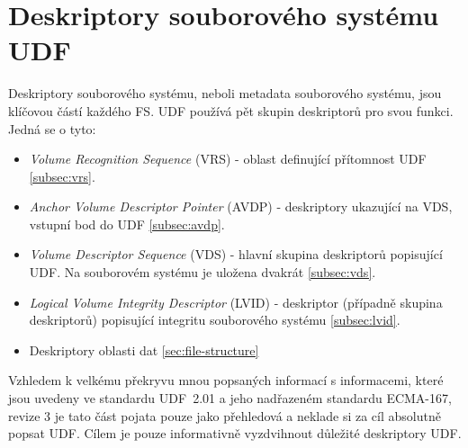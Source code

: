 \section{Deskriptory souborového systému UDF}
\label{sec:deskriptory-udf}
Deskriptory souborového systému, neboli metadata souborového systému, jsou klíčovou částí každého FS. UDF používá pět skupin deskriptorů pro svou funkci. Jedná se o tyto:
\begin{itemize}
    \item \textit{Volume Recognition Sequence} (VRS) - oblast definující přítomnost UDF \ref{subsec:vrs}.
    \item \textit{Anchor Volume Descriptor Pointer} (AVDP) - deskriptory ukazující na VDS, vstupní bod do UDF \ref{subsec:avdp}.
    \item \textit{Volume Descriptor Sequence} (VDS) - hlavní skupina deskriptorů popisující UDF. Na souborovém systému je uložena dvakrát \ref{subsec:vds}.
    \item \textit{Logical Volume Integrity Descriptor} (LVID) - deskriptor (případně skupina deskriptorů) popisující integritu souborového systému \ref{subsec:lvid}. 
    \item Deskriptory oblasti dat \ref{sec:file-structure}
\end{itemize}
Vzhledem k velkému překryvu mnou popsaných informací s informacemi, které jsou uvedeny ve standardu UDF~2.01 \cite{osta-udf-0201} a jeho nadřazeném standardu ECMA-167, revize 3 \cite{ecma-167} je tato část pojata pouze jako přehledová a neklade si za cíl absolutně popsat UDF. Cílem je pouze informativně vyzdvihnout důležité deskriptory UDF.

